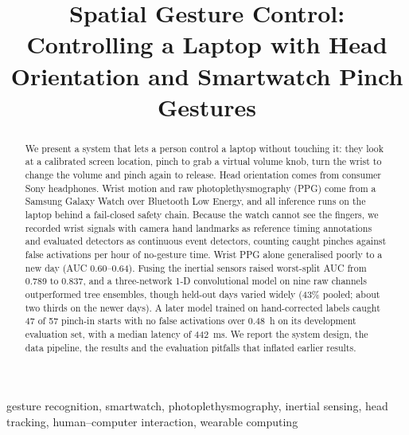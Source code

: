 \documentclass[conference]{IEEEtran}
\begin{document}
\title{Spatial Gesture Control: Controlling a Laptop with Head Orientation and Smartwatch Pinch Gestures}

\author{
}

\maketitle

\begin{abstract}
We present a system that lets a person control a laptop without touching it: they look at a calibrated screen location, pinch to grab a virtual volume knob, turn the wrist to change the volume and pinch again to release. Head orientation comes from consumer Sony headphones. Wrist motion and raw photoplethysmography (PPG) come from a Samsung Galaxy Watch over Bluetooth Low Energy, and all inference runs on the laptop behind a fail-closed safety chain. Because the watch cannot see the fingers, we recorded wrist signals with camera hand landmarks as reference timing annotations and evaluated detectors as continuous event detectors, counting caught pinches against false activations per hour of no-gesture time. Wrist PPG alone generalised poorly to a new day (AUC 0.60--0.64). Fusing the inertial sensors raised worst-split AUC from 0.789 to 0.837, and a three-network 1-D convolutional model on nine raw channels outperformed tree ensembles, though held-out days varied widely (43\% pooled; about two thirds on the newer days). A later model trained on hand-corrected labels caught 47 of 57 pinch-in starts with no false activations over 0.48~h on its development evaluation set, with a median latency of 442~ms. We report the system design, the data pipeline, the results and the evaluation pitfalls that inflated earlier results.
\end{abstract}

\begin{IEEEkeywords}
gesture recognition, smartwatch, photoplethysmography, inertial sensing, head tracking, human--computer interaction, wearable computing
\end{IEEEkeywords}





\end{document}
